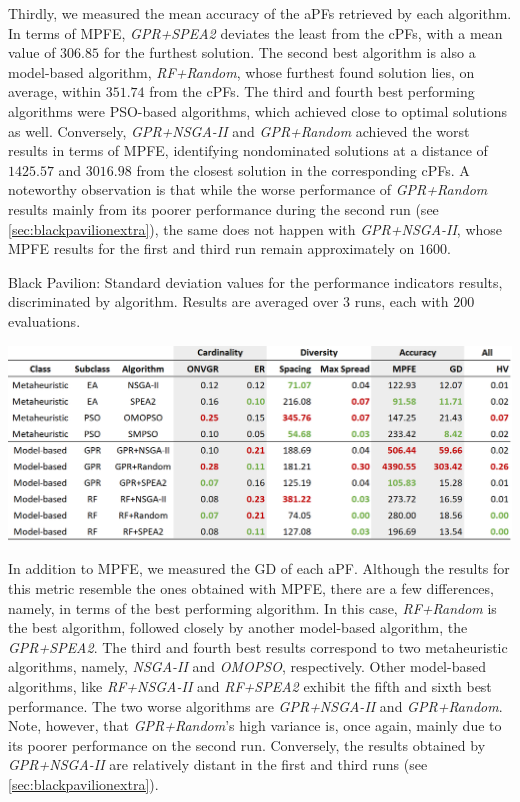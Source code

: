 Thirdly, we measured the mean accuracy of the \acp{aPF} retrieved by each algorithm. In terms of \ac{MPFE}, \textit{GPR+SPEA2} deviates the least from the \acp{cPF}, with a mean value of $306.85$ for the furthest solution. The second best algorithm is also a model-based algorithm, \textit{RF+Random}, whose furthest found solution lies, on average, within $351.74$ from the \acp{cPF}. The third and fourth best performing algorithms were \ac{PSO}-based algorithms, which achieved close to optimal solutions as well. Conversely, \textit{GPR+NSGA-II} and \textit{GPR+Random} achieved the worst results in terms of \ac{MPFE}, identifying nondominated solutions at a distance of $1425.57$ and $3016.98$ from the closest solution in the corresponding \acp{cPF}. A noteworthy observation is that while the worse performance of \textit{GPR+Random} results mainly from its poorer performance during the second run (see \cref{sec:blackpavilionextra}), the same does not happen with \textit{GPR+NSGA-II}, whose \ac{MPFE} results for the first and third run remain approximately on $1600$. 

\begin{table}[htbp]
	\centering
	\caption[Black Pavilion: Standard deviation values for the performance indicators results, discriminated by algorithm]{Black Pavilion: Standard deviation values for the performance indicators results, discriminated by algorithm. Results are averaged over $3$ runs, each with $200$ evaluations.}
	\label{table:blackpavilionstd}
	\includegraphics[width=\textwidth]{Images/Evaluation/BlackPavilion/Results_Std_20190428.PNG}
\end{table}

In addition to \ac{MPFE}, we measured the \ac{GD} of each \ac{aPF}. Although the results for this metric resemble the ones obtained with \ac{MPFE}, there are a few differences, namely, in terms of the best performing algorithm. In this case, \textit{RF+Random} is the best algorithm, followed closely by another model-based algorithm, the \textit{GPR+SPEA2}. The third and fourth best results correspond to two metaheuristic algorithms, namely, \textit{NSGA-II} and \textit{OMOPSO}, respectively. Other model-based algorithms, like \textit{RF+NSGA-II} and \textit{RF+SPEA2} exhibit the fifth and sixth best performance. The two worse algorithms are \textit{GPR+NSGA-II} and \textit{GPR+Random}. Note, however, that \textit{GPR+Random}'s high variance is, once again, mainly due to its poorer performance on the second run. Conversely, the results obtained by \textit{GPR+NSGA-II} are relatively distant in the first and third runs (see \cref{sec:blackpavilionextra}).

